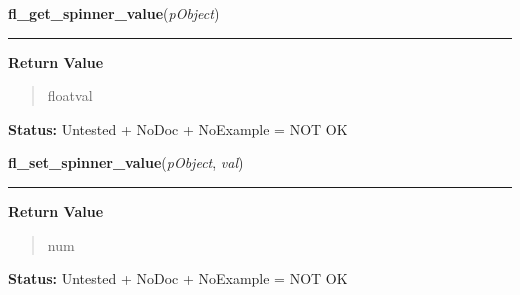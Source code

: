     \label{xformslib:library:fl_get_spinner_value}

    \vspace{0.5ex}

\hspace{.8\funcindent}\begin{boxedminipage}{\funcwidth}

    \raggedright \textbf{fl\_get\_spinner\_value}(\textit{pObject})

    \vspace{-1.5ex}

    \rule{\textwidth}{0.5\fboxrule}
\setlength{\parskip}{2ex}
\setlength{\parskip}{1ex}
      \textbf{Return Value}
    \vspace{-1ex}

      \begin{quote}
      floatval

      \end{quote}

\textbf{Status:} Untested + NoDoc + NoExample = NOT OK



    \end{boxedminipage}

    \label{xformslib:library:fl_set_spinner_value}

    \vspace{0.5ex}

\hspace{.8\funcindent}\begin{boxedminipage}{\funcwidth}

    \raggedright \textbf{fl\_set\_spinner\_value}(\textit{pObject}, \textit{val})

    \vspace{-1.5ex}

    \rule{\textwidth}{0.5\fboxrule}
\setlength{\parskip}{2ex}
\setlength{\parskip}{1ex}
      \textbf{Return Value}
    \vspace{-1ex}

      \begin{quote}
      num

      \end{quote}

\textbf{Status:} Untested + NoDoc + NoExample = NOT OK



    \end{boxedminipage}

